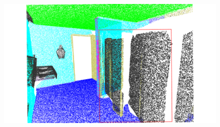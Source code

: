 \begin{figure}[htbp]
\begin{minipage}{0.22\textwidth}
    \end{minipage}
    \hfill
    \begin{minipage}{0.22\textwidth}
        \centering
        \includegraphics[width=\textwidth]{fig/supplement/semantic_segmentation/wc_2/PLT_wc_2.pdf}
    \end{minipage}
    \hfill

    \vspace{0.5em}


\end{figure}
